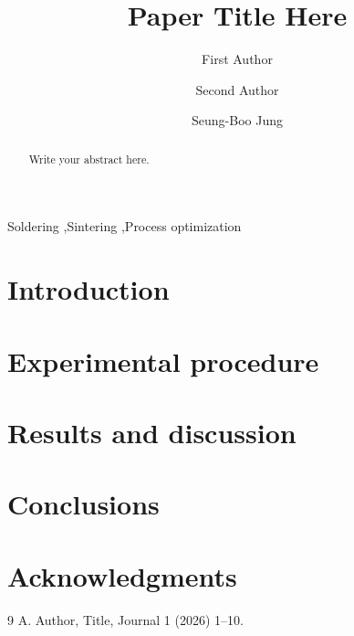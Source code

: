 \documentclass[review]{elsarticle}
\begin{document}
\begin{frontmatter}

\title{Paper Title Here}

\author[skku]{First Author}
\author[skku]{Second Author}
\author[skku]{Seung-Boo Jung}

\begin{abstract}
Write your abstract here.
\end{abstract}

\begin{keyword}
Soldering \sep Sintering \sep Process optimization
\end{keyword}

\end{frontmatter}

\section{Introduction}

\section{Experimental procedure}

\section{Results and discussion}

\section{Conclusions}

\section*{Acknowledgments}

\begin{thebibliography}{9}
 A. Author, Title, Journal 1 (2026) 1--10.
\end{thebibliography}
\end{document}
